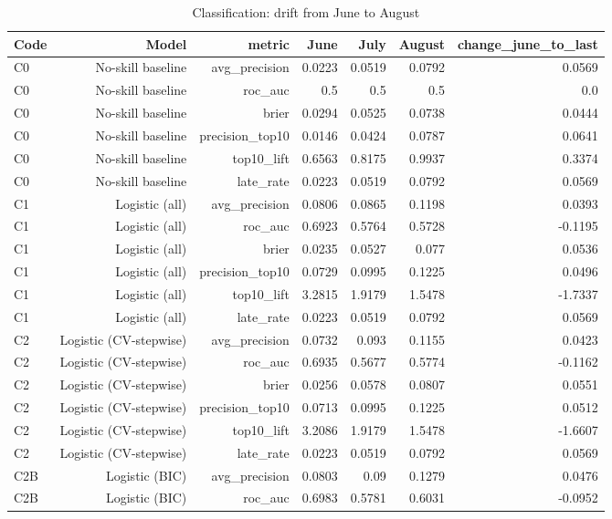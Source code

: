 \begin{table}[htbp]
\centering
\small
\caption{Classification: drift from June to August}
\begin{tabular}{lrrrrrr}
\toprule
Code & Model & metric & June & July & August & change\_june\_to\_last \\
\midrule
C0 & No-skill baseline & avg\_precision & 0.0223 & 0.0519 & 0.0792 & 0.0569 \\
C0 & No-skill baseline & roc\_auc & 0.5 & 0.5 & 0.5 & 0.0 \\
C0 & No-skill baseline & brier & 0.0294 & 0.0525 & 0.0738 & 0.0444 \\
C0 & No-skill baseline & precision\_top10 & 0.0146 & 0.0424 & 0.0787 & 0.0641 \\
C0 & No-skill baseline & top10\_lift & 0.6563 & 0.8175 & 0.9937 & 0.3374 \\
C0 & No-skill baseline & late\_rate & 0.0223 & 0.0519 & 0.0792 & 0.0569 \\
C1 & Logistic (all) & avg\_precision & 0.0806 & 0.0865 & 0.1198 & 0.0393 \\
C1 & Logistic (all) & roc\_auc & 0.6923 & 0.5764 & 0.5728 & -0.1195 \\
C1 & Logistic (all) & brier & 0.0235 & 0.0527 & 0.077 & 0.0536 \\
C1 & Logistic (all) & precision\_top10 & 0.0729 & 0.0995 & 0.1225 & 0.0496 \\
C1 & Logistic (all) & top10\_lift & 3.2815 & 1.9179 & 1.5478 & -1.7337 \\
C1 & Logistic (all) & late\_rate & 0.0223 & 0.0519 & 0.0792 & 0.0569 \\
C2 & Logistic (CV-stepwise) & avg\_precision & 0.0732 & 0.093 & 0.1155 & 0.0423 \\
C2 & Logistic (CV-stepwise) & roc\_auc & 0.6935 & 0.5677 & 0.5774 & -0.1162 \\
C2 & Logistic (CV-stepwise) & brier & 0.0256 & 0.0578 & 0.0807 & 0.0551 \\
C2 & Logistic (CV-stepwise) & precision\_top10 & 0.0713 & 0.0995 & 0.1225 & 0.0512 \\
C2 & Logistic (CV-stepwise) & top10\_lift & 3.2086 & 1.9179 & 1.5478 & -1.6607 \\
C2 & Logistic (CV-stepwise) & late\_rate & 0.0223 & 0.0519 & 0.0792 & 0.0569 \\
C2B & Logistic (BIC) & avg\_precision & 0.0803 & 0.09 & 0.1279 & 0.0476 \\
C2B & Logistic (BIC) & roc\_auc & 0.6983 & 0.5781 & 0.6031 & -0.0952 \\

\end{tabular}
\end{table}
